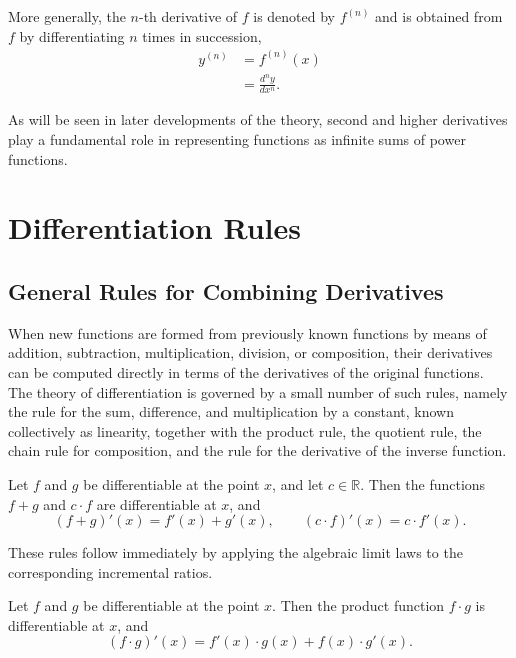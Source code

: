More generally, the $n$-th derivative of $f$ is denoted by $f^{(n)}$ and is obtained from $f$ by differentiating $n$ times in succession,
\[
\begin{aligned}
y^{(n)} &= f^{(n)}(x) \\
&= \frac{d^n y}{dx^n}.
\end{aligned}
\]

As will be seen in later developments of the theory, second and higher derivatives play a fundamental role in representing functions as infinite sums of power functions.

\section{Differentiation Rules}

\subsection{General Rules for Combining Derivatives}

When new functions are formed from previously known functions by means of addition, subtraction, multiplication, division, or composition, their derivatives can be computed directly in terms of the derivatives of the original functions. The theory of differentiation is governed by a small number of such rules, namely the rule for the sum, difference, and multiplication by a constant, known collectively as linearity, together with the product rule, the quotient rule, the chain rule for composition, and the rule for the derivative of the inverse function.

\begin{theorem}[Linearity]
Let $f$ and $g$ be differentiable at the point $x$, and let $c \in \mathbb{R}$. Then the functions $f + g$ and $c \cdot f$ are differentiable at $x$, and
\[
(f+g)'(x) = f'(x) + g'(x), \qquad (c \cdot f)'(x) = c \cdot f'(x).
\]

\end{theorem}

These rules follow immediately by applying the algebraic limit laws to the corresponding incremental ratios.

\begin{theorem}
Let $f$ and $g$ be differentiable at the point $x$. Then the product function $f \cdot g$ is differentiable at $x$, and
\[
(f \cdot g)'(x) = f'(x) \cdot g(x) + f(x) \cdot g'(x).
\]

\end{theorem}

